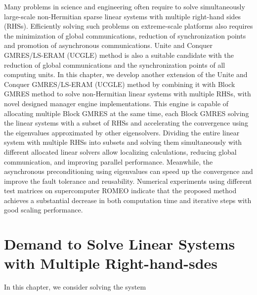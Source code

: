 \begin{displayquote}
	\textsf{Many problems in science and engineering often require to solve simultaneously large-scale non-Hermitian sparse linear systems with multiple right-hand sides (RHSs). Efficiently solving such problems on extreme-scale platforms also requires the minimization of global communications, reduction of synchronization points and promotion of asynchronous communications. Unite and Conquer GMRES/LS-ERAM (UCGLE) method is also a suitable candidate with the reduction of global communications and the synchronization points of all computing units. In this chapter, we develop another extension of the Unite and Conquer GMRES/LS-ERAM (UCGLE) method by combining it with Block GMRES method to solve non-Hermitian linear systems with multiple RHSs, with novel designed manager engine implementations. This engine is capable of allocating multiple Block GMRES at the same time, each Block GMRES solving the linear systems with a subset of RHSs and accelerating the convergence using the eigenvalues approximated by other eigensolvers. Dividing the entire linear system with multiple RHSs into subsets and solving them simultaneously with different allocated linear solvers allow localizing calculations, reducing global communication, and improving parallel performance. Meanwhile, the asynchronous preconditioning using eigenvalues can speed up the convergence and improve the fault tolerance and reusability. Numerical experiments using different test matrices on supercomputer ROMEO indicate that the proposed method achieves a substantial decrease in both computation time and iterative steps with good scaling performance.}
\end{displayquote}

\vspace{1in}

\section{Demand to Solve Linear Systems with Multiple Right-hand-sdes}

In this chapter, we consider solving the system

